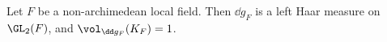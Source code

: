 Let $F$ be a non-archimedean local field. Then $\dd g_F$ is a left Haar measure on $\GL_2(F)$, and
$\vol_{\dd g_F}(K_F)=1$.
